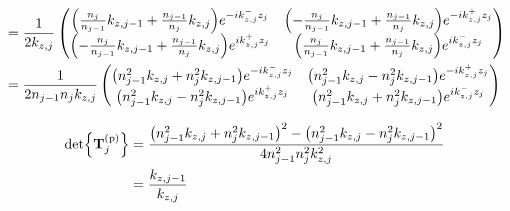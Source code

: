 \begin{align*}
	                                                    & = \frac{1}{2k_{z,j}}\pmqty{
	\pqty{\frac{n_{j}}{n_{j-1}} k_{z,j-1}  +
	\frac{n_{j-1}}{n_{j}} k_{z,j} }e^{-ik_{z,j}^{-}z_j} &
	\pqty{-\frac{n_{j}}{n_{j-1}} k_{z,j-1}  +
	\frac{n_{j-1}}{n_{j}} k_{z,j} } e^{-ik_{z,j}^{+}z_j}                                          \\
	\pqty{-\frac{n_{j}}{n_{j-1}} k_{z,j-1}  +
	\frac{n_{j-1}}{n_{j}} k_{z,j} }e^{ik_{z,j}^{+}z_j}  &
	\pqty{\frac{n_{j}}{n_{j-1}} k_{z,j-1}   +
		\frac{n_{j-1}}{n_{j}} k_{z,j} }e^{ik_{z,j}^{-}z_j}
	}                                                                                             \\
	                                                    & = \frac{1}{2n_{j-1}n_{j}k_{z,j}}\pmqty{
	\pqty{ n_{j-1}^2 k_{z,j} +
	n_{j}^2 k_{z,j-1} }e^{-ik_{z,j}^{-}z_j}             &
	\pqty{n_{j-1}^2 k_{z,j} -
	n_{j}^2 k_{z,j-1} } e^{-ik_{z,j}^{+}z_j}                                                      \\
	\pqty{n_{j-1}^2 k_{z,j} -
	n_{j}^2 k_{z,j-1} }e^{ik_{z,j}^{+}z_j}              &
	\pqty{ n_{j-1}^2 k_{z,j} +
		n_{j}^2 k_{z,j-1} }e^{ik_{z,j}^{-}z_j}
	}
\end{align*}

\begin{align*}
	\det{\vb{T}^{\text{(p)}}_j} & = \frac{
	\pqty{ n_{j-1}^2 k_{z,j} + n_{j}^2 k_{z,j-1} }^2
	- \pqty{n_{j-1}^2 k_{z,j} - n_{j}^2 k_{z,j-1} }^2
	}{4n^2_{j-1}n^2_{j}k^2_{z,j}}                             \\
	                            & = \frac{k_{z,j-1}}{k_{z,j}}
\end{align*}



